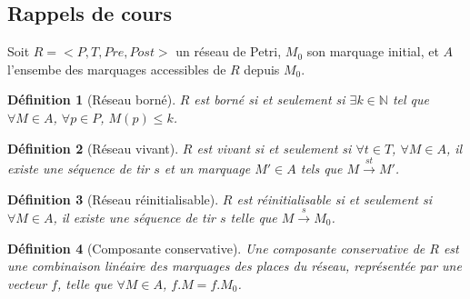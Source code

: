 \documentclass[a4paper]{article}
\newtheorem{definition}{Définition}
\begin{document}
\subsection*{Rappels de cours}

Soit $R = <P, T, Pre, Post>$ un réseau de Petri, $M_0$ son marquage initial, et $A$ l'ensembe des marquages accessibles de $R$ depuis $M_0$.

\begin{definition}[Réseau borné]
$R$ est borné si et seulement si $\exists k \in \mathbb{N}$ tel que $\forall M \in A$, $\forall p \in P$, $M(p) \leq k$.
\end{definition}

\begin{definition}[Réseau vivant]
$R$ est vivant si et seulement si $\forall t \in T$, $\forall M \in A$, il existe une séquence de tir $s$ et un marquage $M' \in A$ tels que
$M \overset{st}{\longrightarrow} M'$.
\end{definition}

\begin{definition}[Réseau réinitialisable]
$R$ est réinitialisable si et seulement si $\forall M \in A$, il existe une séquence de tir $s$ telle que 
$M \overset{s}{\longrightarrow} M_0$.
\end{definition}

\begin{definition}[Composante conservative]
Une composante conservative de $R$ est une combinaison linéaire des marquages des places du réseau, représentée par une vecteur $f$, 
telle que $\forall M \in A$, $f.M = f.M_0$.
\end{definition}


\end{document}

